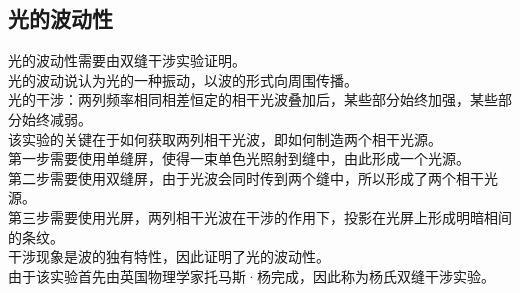 \documentclass[UTF8]{ctexart}
\begin{document}
\subsection{光的波动性}
    光的波动性需要由双缝干涉实验证明。\\[3mm]
    光的波动说认为光的一种振动，以波的形式向周围传播。\\[3mm]
    光的干涉：两列频率相同相差恒定的相干光波叠加后，某些部分始终加强，某些部分始终减弱。\\[5mm]
    该实验的关键在于如何获取两列相干光波，即如何制造两个相干光源。\\[3mm]
    第一步需要使用单缝屏，使得一束单色光照射到缝中，由此形成一个光源。\\[3mm]
    第二步需要使用双缝屏，由于光波会同时传到两个缝中，所以形成了两个相干光源。\\[3mm]
    第三步需要使用光屏，两列相干光波在干涉的作用下，投影在光屏上形成明暗相间的条纹。\\[3mm]
    干涉现象是波的独有特性，因此证明了光的波动性。\\[5mm]
    由于该实验首先由英国物理学家托马斯·杨完成，因此称为杨氏双缝干涉实验。\vspace{8pt}
\end{document}

